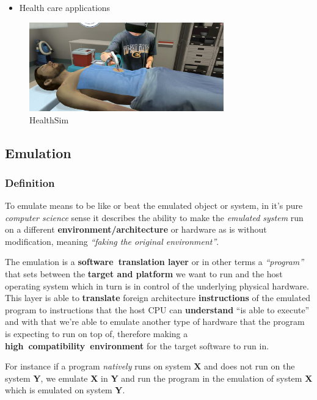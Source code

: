\documentclass[
  14pt,
  english,
  a4paper,
]{scrreprt}
\providecommand{\tightlist}{%
  \setlength{\itemsep}{0pt}\setlength{\parskip}{0pt}}
\begin{document}
\begin{itemize}
\tightlist
\item
  Health care applications
\end{itemize}

\begin{figure}
\centering
\includegraphics[width=0.75\textwidth,height=\textheight]{figures/Healthsim.jpg}
\caption{HealthSim}
\end{figure}

\hypertarget{emulation}{%
\subsection{Emulation}\label{emulation}}

\hypertarget{definition-1}{%
\subsubsection{Definition}\label{definition-1}}

To emulate means to be like or beat the emulated object or system, in
it's pure \emph{computer science} sense it describes the ability to make
the \emph{emulated system} run on a different
\textbf{environment/architecture} or hardware as is without
modification, meaning \emph{``faking the original environment''}.

The emulation is a \textbf{software~translation layer} or in other terms
a \emph{``program''} that sets between the \textbf{target and platform}
we want to run and the host operating system which in turn is in control
of the underlying physical hardware. This layer is able to
\textbf{translate} foreign architecture \textbf{instructions} of the
emulated program to instructions that the host CPU can
\textbf{understand} ``is able to execute'' and with that we're able to
emulate another type of hardware that the program is expecting to run on
top of, therefore making a \textbf{high~compatibility~environment} for
the target software to run in.

For instance if a program \emph{natively} runs on system \textbf{X} and
does not run on the system \textbf{Y}, we emulate \textbf{X} in
\textbf{Y} and run the program in the emulation of system \textbf{X}
which is emulated on system \textbf{Y}.
\end{document}
